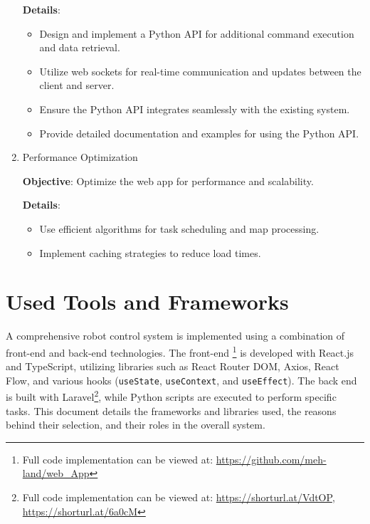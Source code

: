 \begin{enumerate}
        \vspace{-1.5mm}
        \textbf{Details}:
        \begin{itemize}
            \vspace{-1mm}
            \item Design and implement a Python API for additional command execution and data retrieval.
            \vspace{-1mm}
            \item Utilize web sockets for real-time communication and updates between the client and server.
            \vspace{-1mm}
            \item Ensure the Python API integrates seamlessly with the existing system.
            \vspace{-1mm}
            \item Provide detailed documentation and examples for using the Python API.
        \end{itemize}


    \item Performance Optimization
        
        \vspace{-1.5mm}
        \textbf{Objective}: Optimize the web app for performance and scalability.

        \vspace{-1.5mm}
        \textbf{Details}:
        \begin{itemize}
            \vspace{-1mm}
            \item Use efficient algorithms for task scheduling and map processing.
            \vspace{-1mm}
            \item Implement caching strategies to reduce load times.
        \end{itemize}
\end{enumerate}


\section{Used Tools and Frameworks} %
A comprehensive robot control system is implemented using a combination of front-end  and back-end  technologies. The front-end \footnote{Full code implementation can be viewed at: \url{https://github.com/meh-land/web\_App}} is developed with React.js and TypeScript, utilizing libraries such as React Router DOM, Axios, React Flow, and various hooks (\texttt{useState}, \texttt{useContext}, and \texttt{useEffect}). The back end is built with Laravel\footnote{Full code implementation can be viewed at: \url{https://shorturl.at/VdtOP}, \url{https://shorturl.at/6a0cM}}, while Python scripts are executed to perform specific tasks. This document details the frameworks and libraries used, the reasons behind their selection, and their roles in the overall system.


